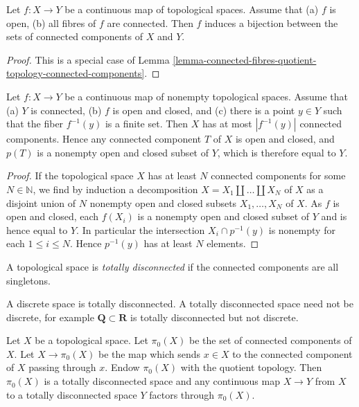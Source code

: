 \begin{lemma}
\label{lemma-connected-fibres-connected-components}
Let $f : X \to Y$ be a continuous map of topological spaces.
Assume that
(a) $f$ is open,
(b) all fibres of $f$ are connected.
Then $f$ induces a bijection between the sets of connected
components of $X$ and $Y$.
\end{lemma}

\begin{proof}
This is a special case of
Lemma \ref{lemma-connected-fibres-quotient-topology-connected-components}.
\end{proof}

\begin{lemma}
\label{lemma-finite-fibre-connected-components}
Let $f : X \to Y$ be a continuous map of nonempty topological spaces. Assume
that
(a) $Y$ is connected,
(b) $f$ is open and closed, and
(c) there is a point $y\in Y$ such that the fiber $f^{-1}(y)$ is a finite set.
Then $X$ has at most $|f^{-1}(y)|$ connected components. Hence any connected 
component $T$ of $X$ is open and closed, and $p(T)$ is a nonempty open and 
closed subset of $Y$, which is therefore equal to $Y$.
\end{lemma}

\begin{proof}
If the topological space $X$ has at least $N$ connected components for some
$N\in \mathbb{N}$, we find by induction a decomposition
$X=X_1\amalg\dots\amalg X_N$ of $X$ as a disjoint union of $N$ nonempty open
and closed subsets $X_1,\dots,X_N$ of $X$. As $f$ is open and closed, each
$f(X_i)$ is a nonempty open and closed subset of $Y$ and is hence equal to
$Y$. In particular  the intersection $X_i\cap p^{-1}(y)$ is nonempty for each
$1\leq i\leq N$. Hence $p^{-1}(y)$ has at least $N$ elements.
\end{proof}

\begin{definition}
\label{definition-totally-disconnected}
A topological space is {\it totally disconnected} if the connected components
are all singletons.
\end{definition}

\noindent
A discrete space is totally disconnected.
A totally disconnected space need not be discrete, for example
$\mathbf{Q} \subset \mathbf{R}$ is totally disconnected but not discrete.

\begin{lemma}
\label{lemma-space-connected-components}
Let $X$ be a topological space. Let $\pi_0(X)$ be the set of connected
components of $X$. Let $X \to \pi_0(X)$ be the map which sends
$x \in X$ to the connected component of $X$ passing through $x$.
Endow $\pi_0(X)$ with the quotient topology. Then $\pi_0(X)$ is a
totally disconnected space and any continuous map $X \to Y$
from $X$ to a totally disconnected space $Y$ factors through $\pi_0(X)$.
\end{lemma}

